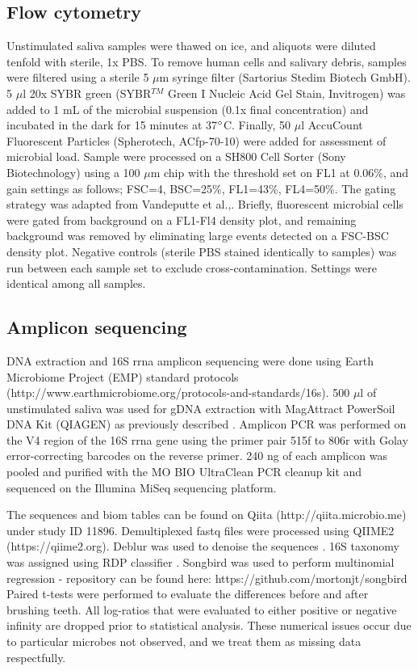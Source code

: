 \subsection{Flow cytometry}
Unstimulated saliva samples were thawed on ice, and aliquots were diluted tenfold with sterile, 1x PBS. To remove human cells and salivary debris, samples were filtered using a sterile 5 $\mu$m syringe filter (Sartorius Stedim Biotech GmbH). 5 $\mu$l 20x SYBR green (SYBR$^{TM}$ Green I Nucleic Acid Gel Stain, Invitrogen) was added to 1 mL of the microbial suspension (0.1x final concentration) and incubated in the dark for 15 minutes at 37$\degree$C.  Finally, 50 $\mu$l AccuCount Fluorescent Particles (Spherotech, AC\gls{fp}-70-10) were added for assessment of microbial load. Sample were processed on a SH800 Cell Sorter (Sony Biotechnology) using a 100 $\mu$m chip with the threshold set on FL1 at 0.06\%, and gain settings as follows; FSC=4, BSC=25\%, FL1=43\%, FL4=50\%. The gating strategy was adapted from Vandeputte et al.,\cite{Vandeputte2017-jl}. Briefly, fluorescent microbial cells were gated from background on a FL1-Fl4 density plot, and remaining background was removed by eliminating large events detected on a FSC-BSC density plot. Negative controls (sterile PBS stained identically to samples) was run between each sample set to exclude cross-contamination. Settings were identical among all samples.

\subsection{Amplicon sequencing}
DNA extraction and 16S \gls{rrna} amplicon sequencing were done using Earth Microbiome Project (EMP) standard protocols (http://www.earthmicrobiome.org/protocols-and-standards/16s). 500 $\mu$l of unstimulated saliva was used for gDNA extraction with MagAttract PowerSoil DNA Kit (QIAGEN) as previously described \cite{Marotz2017-dy}. Amplicon PCR was performed on the V4 region of the 16S \gls{rrna} gene using the primer pair 515f to 806r with Golay error-correcting barcodes on the reverse primer. 240 ng of each amplicon was pooled and purified with the MO BIO UltraClean PCR cleanup kit and sequenced on the Illumina MiSeq sequencing platform.

The sequences and biom tables \cite{McDonald2012-xw} can be found on Qiita (http://qiita.microbio.me) under study ID 11896. Demultiplexed fastq files were processed using QIIME2 (https://qiime2.org)\cite{Caporaso2010-nm}.  Deblur was used to denoise the sequences \cite{Amir2017-zw}.  16S taxonomy was assigned using RDP classifier \cite{Pawlowsky-Glahn2015-qb,Wang2007-gj}. Songbird was used to perform multinomial regression - repository can be found here: https://github.com/mortonjt/songbird
Paired t-tests were performed to evaluate the differences before and after brushing teeth.
All log-ratios that were evaluated to either positive or negative infinity are dropped prior to statistical analysis.
These numerical issues occur due to particular microbes not observed, and we treat them as missing data respectfully.

